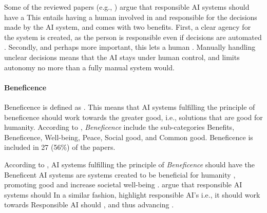 Some of the reviewed papers (e.g., \cite{Brand_2022,Nevanperä_2021}) argue that responsible AI systems should have a  This entails having a human involved in and responsible for the decisions made by the AI system, and comes with two benefits. First, a clear agency for the system is created, as the person is responsible even if decisions are automated \parencite{Nevanperä_2021}. Secondly, and perhaps more important, this lets a human  \parencite[p. 12]{vanBruxvoort_2021}. Manually handling unclear decisions means that the AI stays under human control, and limits autonomy no more than a fully manual system would.


\paragraph{Beneficence}
Beneficence is defined as  \parencite{dictionary_beneficence}. This means that AI systems fulfilling the principle of beneficence should work towards the greater good, i.e., solutions that are good for humanity. According to \textcite{Ryan_2021}, \textit{Beneficence} include the sub-categories Benefits, Beneficence, Well-being, Peace, Social good, and Common good. Beneficence is included in 27 (56\%) of the papers.

According to \textcite[p. 9]{vanBruxvoort_2021}, AI systems fulfilling the principle of \textit{Beneficence} should have the  Beneficent AI systems are systems created to be beneficial for humanity \parencite{Floridi_2018}, promoting good \parencite{Jobin_2019} and increase societal well-being \parencite{Mikalef_2022}. \textcite[p. 103]{BarredoArrieta_2020} argue that responsible AI systems should  In a similar fashion, \textcite[p. 2]{Buhmann_2021} highlight responsible AI's  i.e., it should work towards  Responsible AI should  \parencite[p. 419]{Clarke_2019}, and  thus advancing  \parencite[p. 97534]{Rizinski_2022}.

